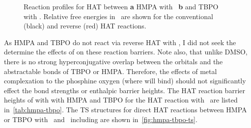 \begin{figure}[!htbp]
  \centering

  \caption[Reaction profiles for HAT between HMPA with \bno\, and TBPO with \bno.]{Reaction profiles for HAT between \textbf{a} HMPA with \bno\, \textbf{b} and TBPO with \bno. Relative free energies in \kcalmol\ are shown for the conventional (black) and reverse (red) HAT reactions.}
  \label{fig:hmpa-tbpo-bno}
\end{figure}


As HMPA and TBPO do not react via reverse HAT with \bno, I did not seek the determine the effects of  on these reaction barriers. Note also, that unlike DMSO, there is no strong hyperconjugative overlap between the  orbitals and the abstractable  bonds of TBPO or HMPA. Therefore, the effects of metal complexation to the phosphine oxygen (where  will bind) should not significantly effect the  bond strengths or enthalpic barrier heights. The HAT reaction barrier heights of  with with HMPA and TBPO for the HAT reaction with \cumo\ are listed in~\ref{tab:hmpa-tbpo}. The TS structures for direct HAT reactions between HMPA or TBPO with \cumo\ and \bno\ including  are shown in~\ref{fig:hmpa-tbpo-ts}.


